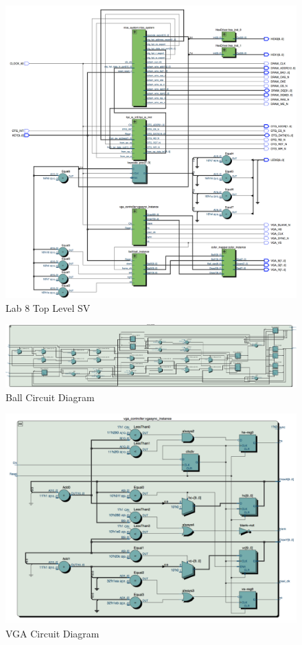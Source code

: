 \documentclass[journal, twocolumn, final,11pt,letterpaper]{IEEEtran}
\begin{document}
\begin{figure} [H]
	\centering
	\includegraphics[scale=.5]{top_level_diagram.png}
	\caption{Lab 8 Top Level SV\label{fig:top-level}}
\end{figure}

\begin{figure} [H]
	\centering
	\includegraphics[scale=1]{ball_diagram.pdf}
	\caption{Ball Circuit Diagram\label{fig:ball}}
\end{figure}

\begin{figure} [H]
	\centering
	\includegraphics[scale=.5]{vga_diagram.png}
	\caption{VGA Circuit Diagram\label{fig:vga}}
\end{figure}
\end{document}

